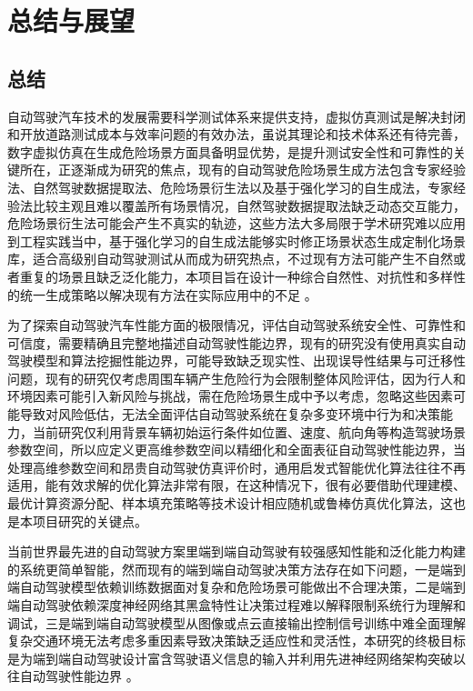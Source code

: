 
\chapter{总结与展望}

\section{总结}


自动驾驶汽车技术的发展需要科学测试体系来提供支持，虚拟仿真测试是解决封闭和开放道路测试成本与效率问题的有效办法，虽说其理论和技术体系还有待完善，数字虚拟仿真在生成危险场景方面具备明显优势，是提升测试安全性和可靠性的关键所在，正逐渐成为研究的焦点，现有的自动驾驶危险场景生成方法包含专家经验法、自然驾驶数据提取法、危险场景衍生法以及基于强化学习的自生成法，专家经验法比较主观且难以覆盖所有场景情况，自然驾驶数据提取法缺乏动态交互能力，危险场景衍生法可能会产生不真实的轨迹，这些方法大多局限于学术研究难以应用到工程实践当中，基于强化学习的自生成法能够实时修正场景状态生成定制化场景库，适合高级别自动驾驶测试从而成为研究热点，不过现有方法可能产生不自然或者重复的场景且缺乏泛化能力，本项目旨在设计一种综合自然性、对抗性和多样性的统一生成策略以解决现有方法在实际应用中的不足 。

为了探索自动驾驶汽车性能方面的极限情况，评估自动驾驶系统安全性、可靠性和可信度，需要精确且完整地描述自动驾驶性能边界，现有的研究没有使用真实自动驾驶模型和算法挖掘性能边界，可能导致缺乏现实性、出现误导性结果与可迁移性问题，现有的研究仅考虑周围车辆产生危险行为会限制整体风险评估，因为行人和环境因素可能引入新风险与挑战，需在危险场景生成中予以考虑，忽略这些因素可能导致对风险低估，无法全面评估自动驾驶系统在复杂多变环境中行为和决策能力，当前研究仅利用背景车辆初始运行条件如位置、速度、航向角等构造驾驶场景参数空间，所以应定义更高维参数空间以精细化和全面表征自动驾驶性能边界，当处理高维参数空间和昂贵自动驾驶仿真评价时，通用启发式智能优化算法往往不再适用，能有效求解的优化算法非常有限，在这种情况下，很有必要借助代理建模、最优计算资源分配、样本填充策略等技术设计相应随机或鲁棒仿真优化算法，这也是本项目研究的关键点。

当前世界最先进的自动驾驶方案里端到端自动驾驶有较强感知性能和泛化能力构建的系统更简单智能，然而现有的端到端自动驾驶决策方法存在如下问题，一是端到端自动驾驶模型依赖训练数据面对复杂和危险场景可能做出不合理决策，二是端到端自动驾驶依赖深度神经网络其黑盒特性让决策过程难以解释限制系统行为理解和调试，三是端到端自动驾驶模型从图像或点云直接输出控制信号训练中难全面理解复杂交通环境无法考虑多重因素导致决策缺乏适应性和灵活性，本研究的终极目标是为端到端自动驾驶设计富含驾驶语义信息的输入并利用先进神经网络架构突破以往自动驾驶性能边界 。

